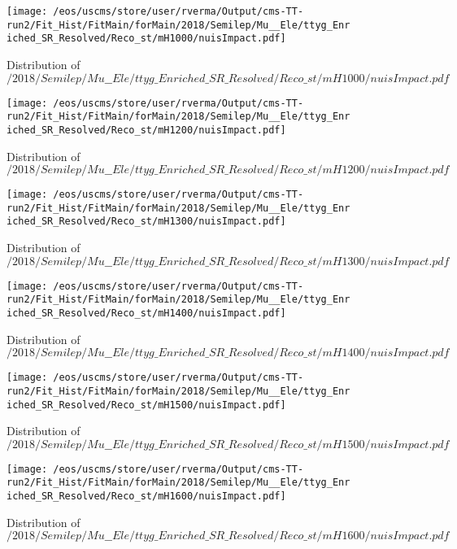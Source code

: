 \begin{figure}
\centering
\texttt{[image: /eos/uscms/store/user/rverma/Output/cms-TT-run2/Fit\_Hist/FitMain/forMain/2018/Semilep/Mu\_\_Ele/ttyg\_Enriched\_SR\_Resolved/Reco\_st/mH1000/nuisImpact.pdf]}
\caption{Distribution of $/2018/Semilep/Mu\_\_Ele/ttyg\_Enriched\_SR\_Resolved/Reco\_st/mH1000/nuisImpact.pdf$}
\end{figure}

\begin{figure}
\centering
\texttt{[image: /eos/uscms/store/user/rverma/Output/cms-TT-run2/Fit\_Hist/FitMain/forMain/2018/Semilep/Mu\_\_Ele/ttyg\_Enriched\_SR\_Resolved/Reco\_st/mH1200/nuisImpact.pdf]}
\caption{Distribution of $/2018/Semilep/Mu\_\_Ele/ttyg\_Enriched\_SR\_Resolved/Reco\_st/mH1200/nuisImpact.pdf$}
\end{figure}

\begin{figure}
\centering
\texttt{[image: /eos/uscms/store/user/rverma/Output/cms-TT-run2/Fit\_Hist/FitMain/forMain/2018/Semilep/Mu\_\_Ele/ttyg\_Enriched\_SR\_Resolved/Reco\_st/mH1300/nuisImpact.pdf]}
\caption{Distribution of $/2018/Semilep/Mu\_\_Ele/ttyg\_Enriched\_SR\_Resolved/Reco\_st/mH1300/nuisImpact.pdf$}
\end{figure}

\begin{figure}
\centering
\texttt{[image: /eos/uscms/store/user/rverma/Output/cms-TT-run2/Fit\_Hist/FitMain/forMain/2018/Semilep/Mu\_\_Ele/ttyg\_Enriched\_SR\_Resolved/Reco\_st/mH1400/nuisImpact.pdf]}
\caption{Distribution of $/2018/Semilep/Mu\_\_Ele/ttyg\_Enriched\_SR\_Resolved/Reco\_st/mH1400/nuisImpact.pdf$}
\end{figure}

\begin{figure}
\centering
\texttt{[image: /eos/uscms/store/user/rverma/Output/cms-TT-run2/Fit\_Hist/FitMain/forMain/2018/Semilep/Mu\_\_Ele/ttyg\_Enriched\_SR\_Resolved/Reco\_st/mH1500/nuisImpact.pdf]}
\caption{Distribution of $/2018/Semilep/Mu\_\_Ele/ttyg\_Enriched\_SR\_Resolved/Reco\_st/mH1500/nuisImpact.pdf$}
\end{figure}

\begin{figure}
\centering
\texttt{[image: /eos/uscms/store/user/rverma/Output/cms-TT-run2/Fit\_Hist/FitMain/forMain/2018/Semilep/Mu\_\_Ele/ttyg\_Enriched\_SR\_Resolved/Reco\_st/mH1600/nuisImpact.pdf]}
\caption{Distribution of $/2018/Semilep/Mu\_\_Ele/ttyg\_Enriched\_SR\_Resolved/Reco\_st/mH1600/nuisImpact.pdf$}
\end{figure}

